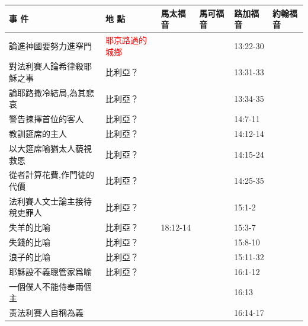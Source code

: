 \begin{table}[H]
  \centering
    \begin{tabular}{p{14em}|p{7.93em}|l|l|l|p{4.855em}}
    \toprule
    \textbf{事 件} & \textbf{地 點} & \multicolumn{1}{p{5.285em}|}{\textbf{馬太福音}} & \multicolumn{1}{p{5.57em}|}{\textbf{馬可福音}} & \multicolumn{1}{p{5.285em}|}{\textbf{路加福音}} & \textbf{約翰福音} \\  \midrule


論進神國要努力進窄門&\textcolor{red}{耶京路過的城鄉}&       &       & \multicolumn{1}{p{5.285em}|}{13:22-30} & \multicolumn{1}{l}{} \\\midrule
對法利賽人論希律殺耶穌之事& 比利亞？   &       &       & \multicolumn{1}{p{5.285em}|}{13:31-33} & \multicolumn{1}{l}{} \\\midrule

論耶路撒冷結局,為其悲哀 & 比利亞？   &       &       & \multicolumn{1}{p{5.285em}|}{13:34-35} & \multicolumn{1}{l}{} \\\midrule


警告揀擇首位的客人& 比利亞？   & & & \multicolumn{1}{p{5.285em}|}{14:7-11}& \multicolumn{1}{l}{} \\ \midrule
教訓筵席的主人& 比利亞？   & & & \multicolumn{1}{p{5.285em}|}{14:12-14}& \multicolumn{1}{l}{} \\ \midrule

以大筵席喻猶太人藐視救恩& 比利亞？&&& \multicolumn{1}{p{5.285em}|}{14:15-24} & \multicolumn{1}{l}{} \\ \midrule

從者計算花費,作門徒的代價& 比利亞？   &       &       & \multicolumn{1}{p{5.285em}|}{14:25-35} & \multicolumn{1}{l}{} \\ \midrule


法利賽人文士論主接待稅吏罪人& 比利亞？   & &       & \multicolumn{1}{p{5.285em}|}{15:1-2} & \multicolumn{1}{l}{} \\ \midrule

失羊的比喻 & 比利亞？   &18:12-14       &       & \multicolumn{1}{p{5.285em}|}{15:3-7} & \multicolumn{1}{l}{} \\ \midrule
失錢的比喻 & 比利亞？   & &       & \multicolumn{1}{p{5.285em}|}{15:8-10} & \multicolumn{1}{l}{} \\ \midrule

浪子的比喻 & 比利亞？   &&       & \multicolumn{1}{p{5.285em}|}{15:11-32} & \multicolumn{1}{l}{} \\ \midrule

耶穌設不義聰管家爲喻 & 比利亞？   &       &       & \multicolumn{1}{p{5.285em}|}{16:1-12} & \multicolumn{1}{l}{} \\\midrule
一個僕人不能侍奉兩個主&   &       &       & \multicolumn{1}{p{5.285em}|}{16:13} & \multicolumn{1}{l}{} \\\midrule
责法利賽人自稱為義&   &       &       & \multicolumn{1}{p{5.285em}|}{16:14-17} & \multicolumn{1}{l}{} \\\midrule




\end{tabular}
\end{table}
